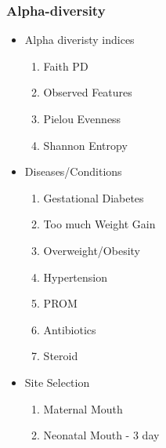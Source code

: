 \documentclass{beamer}
\begin{document}
    \begin{frame}
        \frametitle{Alpha-diversity}

        \begin{itemize}
            \item Alpha diveristy indices
            \begin{enumerate}
                \item Faith PD
                \item Observed Features
                \item Pielou Evenness
                \item Shannon Entropy
            \end{enumerate}

            \item Diseases/Conditions
            \begin{enumerate}
                \item Gestational Diabetes
                \item Too much Weight Gain
                \item Overweight/Obesity
                \item Hypertension
                \item PROM
                \item Antibiotics
                \item Steroid
            \end{enumerate}

            \item Site Selection
            \begin{enumerate}
                \item Maternal Mouth
                \item Neonatal Mouth - 3 day
            \end{enumerate}
        \end{itemize}
    \end{frame}
\end{document}

